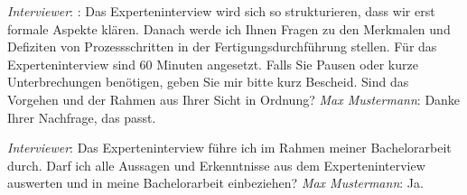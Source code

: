 \textit{Interviewer}: : Das Experteninterview wird sich so strukturieren, dass wir erst formale Aspekte klären. Danach werde ich Ihnen Fragen zu den Merkmalen und Defiziten von Prozessschritten in der Fertigungsdurchführung stellen. Für das Experteninterview sind 60 Minuten angesetzt. Falls Sie Pausen oder kurze Unterbrechungen benötigen, geben Sie mir bitte kurz Bescheid. Sind das Vorgehen und der Rahmen aus Ihrer Sicht in Ordnung?
\newline
\textit{Max Mustermann}: Danke Ihrer Nachfrage, das passt.

\textit{Interviewer}: Das Experteninterview führe ich im Rahmen meiner Bachelorarbeit durch. Darf ich alle Aussagen und Erkenntnisse aus dem Experteninterview auswerten und in meine Bachelorarbeit einbeziehen?
\newline
\textit{Max Mustermann}: Ja.


